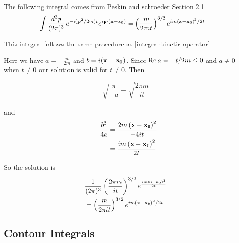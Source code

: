 The following integral comes from Peskin and schroeder Section 2.1
\begin{align}
\int \frac{d^3p}{(2\pi)^3} \, e^{-i(\boldsymbol{\mathbf{p}}^2/2m)t} e^{i\boldsymbol{\mathbf{p}}\cdot(\boldsymbol{\mathbf{x}}-\boldsymbol{\mathbf{x}}_0)}
&= \left( \frac{m}{2\pi i t} \right)^{3/2} e^{im (\boldsymbol{\mathbf{x}}-\boldsymbol{\mathbf{x}}_0)^2 /2t}
\end{align}

This integral follows the same procedure as \ref{integral:kinetic-operator}.

Here we have $a = -\frac{it}{2m}$ and $b = i(\boldsymbol{\mathbf{x}}-\boldsymbol{\mathbf{x_0}})$.
Since $\operatorname{Re}{a} = -t/2m \leq 0$ and $a\neq 0$ when $t\neq 0$ our solution is valid for $t\neq 0$.
Then

$$
\sqrt{ \frac{\pi}{-a} } = \sqrt{ \frac{2\pi m}{it} }
$$

and
\begin{align*}
-\frac{b^2}{4a} &= \frac{2m \left(\boldsymbol{\mathbf{x}}-\boldsymbol{\mathbf{x}}_0\right)^2}{-4it} \\
&= \frac{im \left(\boldsymbol{\mathbf{x}}-\boldsymbol{\mathbf{x}}_0\right)^2}{2t}
\end{align*}

So the solution is
\begin{align*}
& \frac{1}{(2\pi)^3} \left( \frac{2\pi m}{it} \right)^{3/2} e^{\frac{im \left(\boldsymbol{\mathbf{x}}-\boldsymbol{\mathbf{x}}_0\right)^2}{2t}} \\
&= \left( \frac{m}{2\pi it} \right)^{3/2} e^{im \left(\boldsymbol{\mathbf{x}}-\boldsymbol{\mathbf{x}}_0\right)^2 /2t}
\end{align*}







\subsection{Contour Integrals}